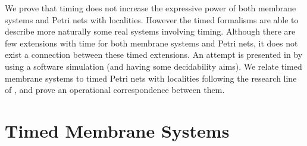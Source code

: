 \documentclass{eptcs}
\begin{document}
\begin{center}
\end{center}

\medskip

We prove that timing does not increase the expressive power of both membrane
systems and Petri nets with localities. However the timed formalisms are able
to describe more naturally some real systems involving timing. Although there
are few extensions with time for both membrane systems and Petri nets, it does
not exist a connection between these timed extensions. An attempt is presented
in \cite{Profir05} by using a software simulation (and having some decidability
aims). We relate timed membrane systems to timed Petri nets with localities
following the research line of \cite{Kleijn06}, and prove an operational
correspondence between them.

\section{Timed Membrane Systems}
\label{section:timed_symanti}
\end{document}
